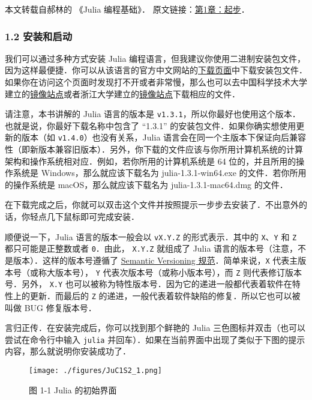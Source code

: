 
本文转载自郝林的 《Julia 编程基础》． 原文链接：\href{https://github.com/hyper0x/JuliaBasics/blob/master/book/ch01.md}{第1章：起步}．

\subsubsection{1.2 安装和启动}

我们可以通过多种方式安装 Julia 编程语言，但我建议你使用二进制安装包文件，因为这样最便捷．你可以从该语言的官方中文网站的\href{https://cn.julialang.org/downloads/}{下载页面}中下载安装包文件．如果你在访问这个页面时发现打不开或者非常慢，那么也可以去中国科学技术大学建立的\href{https://mirrors.zju.edu.cn/julia/releases/}{镜像站点}或者浙江大学建立的\href{https://mirrors.ustc.edu.cn/julia/releases/}{镜像站点}下载相应的文件．

请注意，本书讲解的 Julia 语言的版本是 \verb|v1.3.1|，所以你最好也使用这个版本．也就是说，你最好下载名称中包含了 “1.3.1” 的安装包文件．如果你确实想使用更新的版本（如 \verb|v1.4.0|）也没有关系，Julia 语言会在同一个主版本下保证向后兼容性（即新版本兼容旧版本）．另外，你下载的文件应该与你所用计算机系统的计算架构和操作系统相对应．例如，若你所用的计算机系统是 64 位的，并且所用的操作系统是 Windows，那么就应该下载名为 julia-1.3.1-win64.exe 的文件．若你所用的操作系统是 macOS，那么就应该下载名为 julia-1.3.1-mac64.dmg 的文件．

在下载完成之后，你就可以双击这个文件并按照提示一步步去安装了．不出意外的话，你轻点几下鼠标即可完成安装．

顺便说一下，Julia 语言的版本一般会以 \verb|vX.Y.Z| 的形式表示．其中的 \verb|X|、\verb|Y| 和 \verb|Z| 都只可能是正整数或者 \verb|0|．由此， \verb|X.Y.Z| 就组成了 Julia 语言的版本号（注意，不是版本）．这样的版本号遵循了 \href{https://semver.org}{Semantic Versioning 规范}．简单来说，\verb|X| 代表主版本号（或称大版本号）， \verb|Y| 代表次版本号（或称小版本号），而 \verb|Z| 则代表修订版本号．另外， \verb|X.Y| 也可以被称为特性版本号．因为它的递进一般都代表着软件在特性上的更新．而最后的 \verb|Z| 的递进，一般代表着软件缺陷的修复．所以它也可以被叫做 BUG 修复版本号．

言归正传．在安装完成后，你可以找到那个鲜艳的 Julia 三色图标并双击（也可以尝试在命令行中输入 \verb|julia| 并回车）．如果在当前界面中出现了类似于下图的提示内容，那么就说明你安装成功了．

\begin{figure}[ht]
\centering
\texttt{[image: ./figures/JuC1S2\_1.png]}
\caption{图 1-1 Julia 的初始界面} \label{JuC1S2_fig1}
\end{figure}

